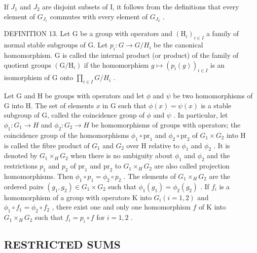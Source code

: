 If \(J_{1}\) and \(J_{2}\) are disjoint subsets of I, it follows from the definitions that every element of \(G_{J_{1}}\) commutes with every element of \(G_{J_{2}}\) .

DEFINITION 13. Let G be a group with operators and \((\mathrm{H}_{i})_{i\in I}\) a family of normal stable subgroups of G. Let \(p_{i}\colon G\to G/H_{i}\) be the canonical homomorphism. G is called the internal product (or product) of the family of quotient groups \((\mathrm{G}/\mathrm{H}_{i})\) if the homomorphism \(g\mapsto(p_{i}(g))_{i\in I}\) is an isomorphism of G onto \(\prod_{i\in I}G/H_{i}\) .

Let G and H be groups with operators and let \(\phi\) and \(\psi\) be two homomorphisms of G into H. The set of elements \(x\) in G such that \(\phi(x) = \psi(x)\) is a stable subgroup of G, called the coincidence group of \(\phi\) and \(\psi\) . In particular, let \(\phi_1: G_1 \to H\) and \(\phi_2: G_2 \to H\) be homomorphisms of groups with operators; the coincidence group of the homomorphisms \(\phi_1 \circ \mathrm{pr}_1\) and \(\phi_2 \circ \mathrm{pr}_2\) of \(G_1 \times G_2\) into H is called the fibre product of \(G_1\) and \(G_2\) over H relative to \(\phi_1\) and \(\phi_2\) . It is denoted by \(G_1 \times_H G_2\) when there is no ambiguity about \(\phi_1\) and \(\phi_2\) and the restrictions \(p_1\) and \(p_2\) of \(\mathrm{pr}_1\) and \(\mathrm{pr}_2\) to \(G_1 \times_H G_2\) are also called projection homomorphisms. Then \(\phi_1 \circ p_1 = \phi_2 \circ p_2\) . The elements of \(G_1 \times_H G_2\) are the ordered pairs \((g_1, g_2) \in G_1 \times G_2\) such that \(\phi_1(g_1) = \phi_2(g_2)\) . If \(f_i\) is a homomorphism of a group with operators K into \(G_i (i = 1, 2)\) and \(\phi_1 \circ f_1 = \phi_2 \circ f_2\) , there exist one and only one homomorphism \(f\) of K into \(G_1 \times_H G_2\) such that \(f_i = p_i \circ f\) for \(i = 1, 2\) .

\subsection{RESTRICTED SUMS}

